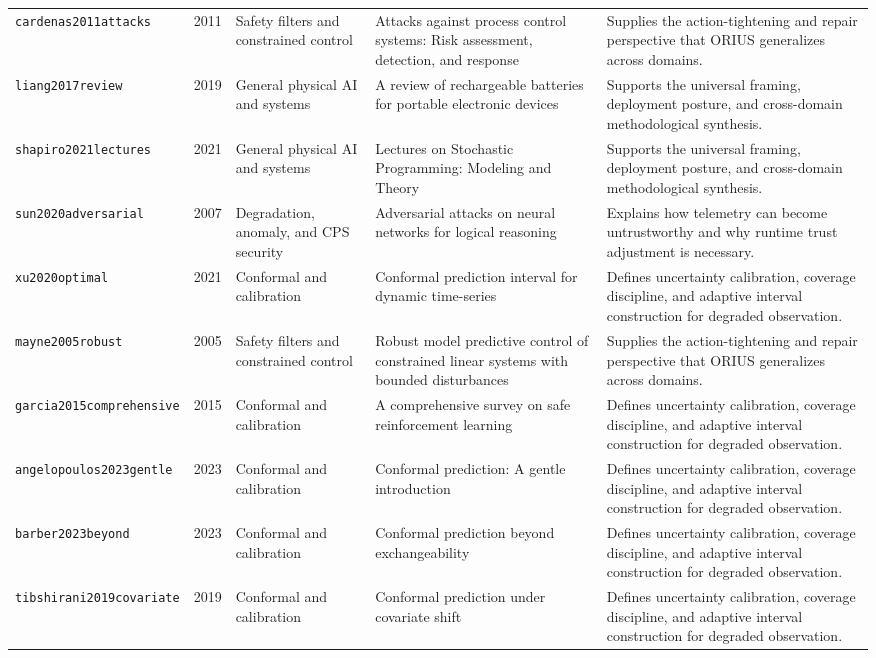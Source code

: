 \begin{longtable}{p{}p{}p{}p{}p{}}
\texttt{cardenas2011attacks} & 2011 & Safety filters and constrained control & Attacks against process control systems: Risk assessment, detection, and response & Supplies the action-tightening and repair perspective that ORIUS generalizes across domains.\\
\texttt{liang2017review} & 2019 & General physical AI and systems & A review of rechargeable batteries for portable electronic devices & Supports the universal framing, deployment posture, and cross-domain methodological synthesis.\\
\texttt{shapiro2021lectures} & 2021 & General physical AI and systems & Lectures on Stochastic Programming: Modeling and Theory & Supports the universal framing, deployment posture, and cross-domain methodological synthesis.\\
\texttt{sun2020adversarial} & 2007 & Degradation, anomaly, and CPS security & Adversarial attacks on neural networks for logical reasoning & Explains how telemetry can become untrustworthy and why runtime trust adjustment is necessary.\\
\texttt{xu2020optimal} & 2021 & Conformal and calibration & Conformal prediction interval for dynamic time-series & Defines uncertainty calibration, coverage discipline, and adaptive interval construction for degraded observation.\\
\texttt{mayne2005robust} & 2005 & Safety filters and constrained control & Robust model predictive control of constrained linear systems with bounded disturbances & Supplies the action-tightening and repair perspective that ORIUS generalizes across domains.\\
\texttt{garcia2015comprehensive} & 2015 & Conformal and calibration & A comprehensive survey on safe reinforcement learning & Defines uncertainty calibration, coverage discipline, and adaptive interval construction for degraded observation.\\
\texttt{angelopoulos2023gentle} & 2023 & Conformal and calibration & Conformal prediction: A gentle introduction & Defines uncertainty calibration, coverage discipline, and adaptive interval construction for degraded observation.\\
\texttt{barber2023beyond} & 2023 & Conformal and calibration & Conformal prediction beyond exchangeability & Defines uncertainty calibration, coverage discipline, and adaptive interval construction for degraded observation.\\
\texttt{tibshirani2019covariate} & 2019 & Conformal and calibration & Conformal prediction under covariate shift & Defines uncertainty calibration, coverage discipline, and adaptive interval construction for degraded observation.\\

\end{longtable}
